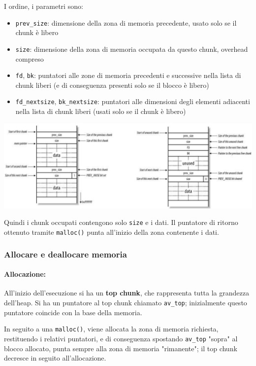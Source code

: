 I ordine, i parametri sono:
\begin{itemize}
	\item \texttt{prev\_size}: dimensione della zona di memoria precedente, usato solo se il chunk è libero

	\item \texttt{size}: dimensione della zona di memoria occupata da questo chunk, overhead compreso

	\item \texttt{fd}, \texttt{bk}: puntatori alle zone di memoria precedenti e successive nella lista di chunk liberi (e di conseguenza presenti solo se il blocco è libero)

	\item \texttt{fd\_nextsize}, \texttt{bk\_nextsize}: puntatori alle dimensioni degli elementi adiacenti nella lista di chunk liberi (usati solo se il chunk è libero)
\end{itemize}
\begin{center}
	\includegraphics[width=\linewidth]{img/sme/heapchunk}
\end{center}

Quindi i chunk occupati contengono solo \texttt{size} e i dati. Il puntatore di ritorno ottenuto tramite \texttt{malloc()} punta all'inizio della zona contenente i dati.

\subsubsection{Allocare e deallocare memoria}

\paragraph{Allocazione:} All'inizio dell'esecuzione si ha un \textbf{top chunk}, che rappresenta tutta la grandezza dell'heap. Si ha un puntatore al top chunk chiamato \texttt{av\_top}; inizialmente questo puntatore coincide con la base della memoria. 

In seguito a una \texttt{malloc()}, viene allocata la zona di memoria richiesta, restituendo i relativi puntatori, e di conseguenza spostando \texttt{av\_top} "sopra" al blocco allocato, punta sempre alla zona di memoria "rimanente"; il top chunk decresce in seguito all'allocazione.

